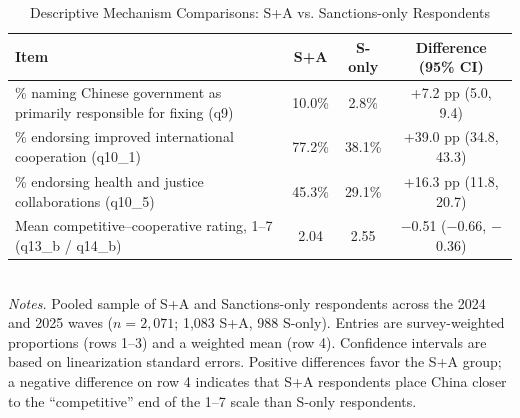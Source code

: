 \documentclass[12pt,letterpaper]{article}
\begin{document}
\begin{table}[!h]
\centering
\small
\caption{Descriptive Mechanism Comparisons: S+A vs. Sanctions-only Respondents}
\label{tab:mechanism_descriptive}
\begin{tabular}{p{}ccc}
\toprule
Item & S+A & S-only & Difference (95\% CI) \\
\midrule
\% naming Chinese government as primarily responsible for fixing (q9) & 10.0\% & 2.8\% & +7.2 pp (5.0, 9.4) \\
\% endorsing improved international cooperation (q10\_1) & 77.2\% & 38.1\% & +39.0 pp (34.8, 43.3) \\
\% endorsing health and justice collaborations (q10\_5) & 45.3\% & 29.1\% & +16.3 pp (11.8, 20.7) \\
Mean competitive--cooperative rating, 1--7 (q13\_b / q14\_b) & 2.04 & 2.55 & $-$0.51 ($-$0.66, $-$0.36) \\
\bottomrule
\end{tabular}
\\[0.5em]
\footnotesize \textit{Notes.} Pooled sample of S+A and Sanctions-only respondents across the 2024 and 2025 waves ($n = 2{,}071$; 1{,}083 S+A, 988 S-only). Entries are survey-weighted proportions (rows 1--3) and a weighted mean (row 4). Confidence intervals are based on linearization standard errors. Positive differences favor the S+A group; a negative difference on row 4 indicates that S+A respondents place China closer to the ``competitive'' end of the 1--7 scale than S-only respondents.
\end{table}
\end{document}
